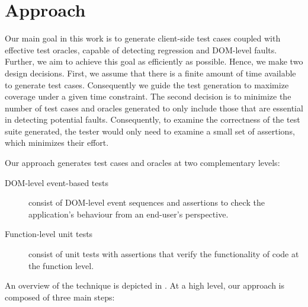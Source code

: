 \section{Approach} \label{Sec:approach}
Our main goal in this work is to generate client-side test cases coupled with
effective test oracles, capable of detecting regression \javascript and DOM-level faults. 
Further, we aim to achieve this goal as efficiently as possible. Hence, we make two design decisions. First, we assume that there is a finite amount of time available to generate test cases. Consequently we guide the test generation  to maximize coverage under a given time constraint. 
The second decision is to minimize the number of test cases and oracles generated to only include those that are essential in detecting potential faults. %
Consequently, to examine the correctness of the test suite generated, the tester would only need to examine a small set of assertions, which minimizes their effort.

Our approach generates test cases and oracles at two complementary levels:
\begin{description}%
\item[DOM-level event-based tests] consist of DOM-level event sequences and assertions to check the application's behaviour from an end-user's perspective. 
\item[Function-level unit tests]  consist of unit tests with assertions that verify the functionality of \javascript code at the function level.
\end{description}

An overview of the technique is depicted in . 
At a high level, our approach is composed of three main steps:

